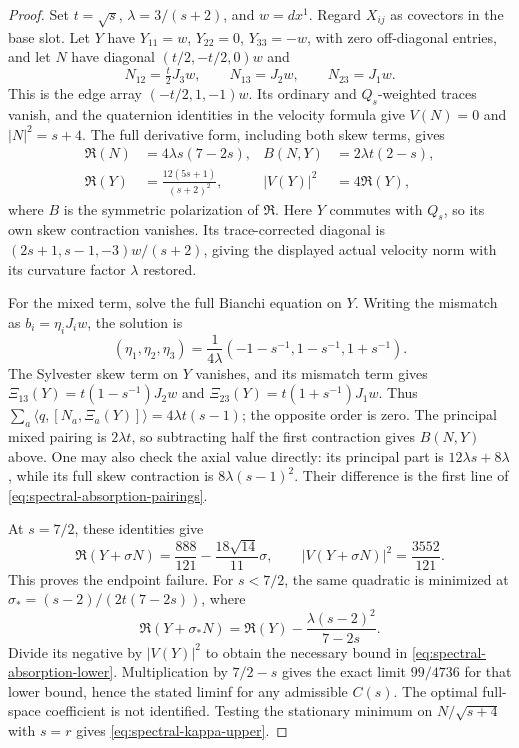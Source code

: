 \documentclass[11pt]{article}
\numberwithin{equation}{section}
\theoremstyle{definition}
\theoremstyle{remark}
\begin{document}
\begin{proof}
Set $t=\sqrt{s}$, $\lambda=3/(s+2)$, and $w=dx^1$.
Regard $X_{ij}$ as covectors in the base slot. Let $Y$ have
$Y_{11}=w$, $Y_{22}=0$, $Y_{33}=-w$, with zero off-diagonal
entries, and let $N$ have diagonal $(t/2,-t/2,0)w$ and
\[
 N_{12}=\tfrac t2J_3w,\qquad N_{13}=J_2w,\qquad N_{23}=J_1w.
\]
This is the edge array $(-t/2,1,-1)w$. Its ordinary and
$Q_s$-weighted traces vanish, and the quaternion identities
in the velocity formula give $V(N)=0$ and $|N|^2=s+4$.
The full derivative form, including both skew terms, gives
\begin{equation}\label{eq:spectral-absorption-pairings}
 \begin{aligned}
 \mathfrak R(N)&=4\lambda s(7-2s),&
 B(N,Y)&=2\lambda t(2-s),\\
 \mathfrak R(Y)&=\frac{12(5s+1)}{(s+2)^2},&
 |V(Y)|^2&=4\mathfrak R(Y),
 \end{aligned}
\end{equation}
where $B$ is the symmetric polarization of $\mathfrak R$.
Here $Y$ commutes with $Q_s$, so its own skew contraction
vanishes. Its trace-corrected diagonal is
$(2s+1,s-1,-3)w/(s+2)$, giving the displayed actual velocity
norm with its curvature factor $\lambda$ restored.

For the mixed term, solve the full Bianchi equation on $Y$.
Writing the mismatch as $b_i=\eta_iJ_iw$, the solution is
\[
 (\eta_1,\eta_2,\eta_3)
 =\frac{1}{4\lambda}(-1-s^{-1},1-s^{-1},1+s^{-1}).
\]
The Sylvester skew term on $Y$ vanishes, and its mismatch
term gives
$\Xi_{13}(Y)=t(1-s^{-1})J_2w$ and
$\Xi_{23}(Y)=t(1+s^{-1})J_1w$.
Thus $\sum_a\langle q,[N_a,\Xi_a(Y)]\rangle
=4\lambda t(s-1)$; the opposite order is zero.
The principal mixed pairing is $2\lambda t$, so subtracting
half the first contraction gives $B(N,Y)$ above.
One may also check the axial value directly: its principal
part is $12\lambda s+8\lambda$, while its full skew
contraction is $8\lambda(s-1)^2$. Their difference is the
first line of \eqref{eq:spectral-absorption-pairings}.

At $s=7/2$, these identities give
\[
 \mathfrak R(Y+\sigma N)=\frac{888}{121}
                  -\frac{18\sqrt{14}}{11}\sigma,
 \qquad |V(Y+\sigma N)|^2=\frac{3552}{121}.
\]
This proves the endpoint failure. For $s<7/2$, the same
quadratic is minimized at
$\sigma_*=(s-2)/(2t(7-2s))$, where
\[
 \mathfrak R(Y+\sigma_*N)
 =\mathfrak R(Y)-\frac{\lambda(s-2)^2}{7-2s}.
\]
Divide its negative by $|V(Y)|^2$ to obtain the necessary
bound in \eqref{eq:spectral-absorption-lower}. Multiplication
by $7/2-s$ gives the exact limit $99/4736$ for that lower
bound, hence the stated liminf for any admissible $C(s)$.
The optimal full-space coefficient is not identified.
Testing the stationary minimum on $N/\sqrt{s+4}$ with
$s=r$ gives \eqref{eq:spectral-kappa-upper}.


\end{proof}
\end{document}
